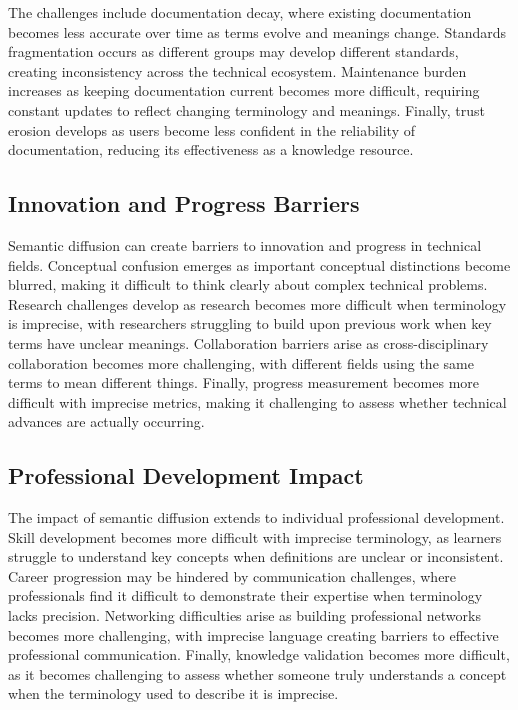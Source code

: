 \documentclass[11pt]{article}
\begin{document}
The challenges include documentation decay, where existing documentation becomes less accurate over time as terms evolve and meanings change. Standards fragmentation occurs as different groups may develop different standards, creating inconsistency across the technical ecosystem. Maintenance burden increases as keeping documentation current becomes more difficult, requiring constant updates to reflect changing terminology and meanings. Finally, trust erosion develops as users become less confident in the reliability of documentation, reducing its effectiveness as a knowledge resource.

\subsection{Innovation and Progress Barriers}

Semantic diffusion can create barriers to innovation and progress in technical fields. Conceptual confusion emerges as important conceptual distinctions become blurred, making it difficult to think clearly about complex technical problems. Research challenges develop as research becomes more difficult when terminology is imprecise, with researchers struggling to build upon previous work when key terms have unclear meanings. Collaboration barriers arise as cross-disciplinary collaboration becomes more challenging, with different fields using the same terms to mean different things. Finally, progress measurement becomes more difficult with imprecise metrics, making it challenging to assess whether technical advances are actually occurring.

\subsection{Professional Development Impact}

The impact of semantic diffusion extends to individual professional development. Skill development becomes more difficult with imprecise terminology, as learners struggle to understand key concepts when definitions are unclear or inconsistent. Career progression may be hindered by communication challenges, where professionals find it difficult to demonstrate their expertise when terminology lacks precision. Networking difficulties arise as building professional networks becomes more challenging, with imprecise language creating barriers to effective professional communication. Finally, knowledge validation becomes more difficult, as it becomes challenging to assess whether someone truly understands a concept when the terminology used to describe it is imprecise.
\end{document}
